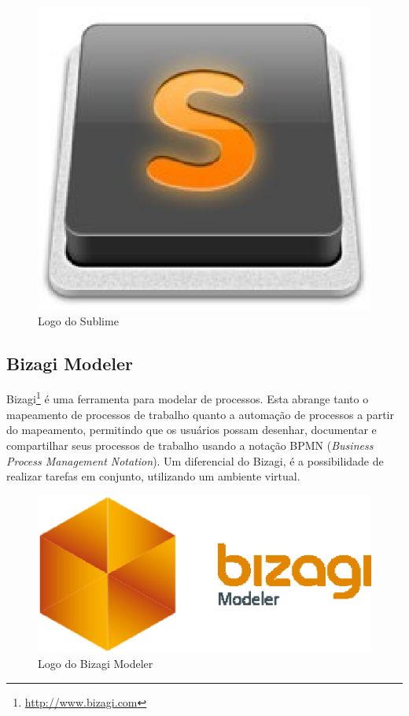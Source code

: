 \begin{figure}[!h]
	\centering
	\includegraphics[scale=0.35]{figuras/capitulo3/sublime.eps}
	\caption{Logo do Sublime}
	\label{sublime}
\end{figure}

\subsection{Bizagi Modeler}

Bizagi\footnote{\url{http://www.bizagi.com}} é uma ferramenta para modelar de processos. Esta abrange tanto o mapeamento de processos de trabalho quanto a automação de processos a partir do mapeamento, permitindo que os usuários possam desenhar, documentar e compartilhar seus processos de trabalho usando a notação BPMN (\textit{Business Process Management Notation}). Um diferencial do Bizagi, é a possibilidade de realizar tarefas em conjunto, utilizando um ambiente virtual.

\begin{figure}[!h]
	\centering
	\includegraphics[scale=0.4]{figuras/capitulo3/bizagi.eps}
	\caption{Logo do Bizagi Modeler}
	\label{bizagi}
\end{figure}

